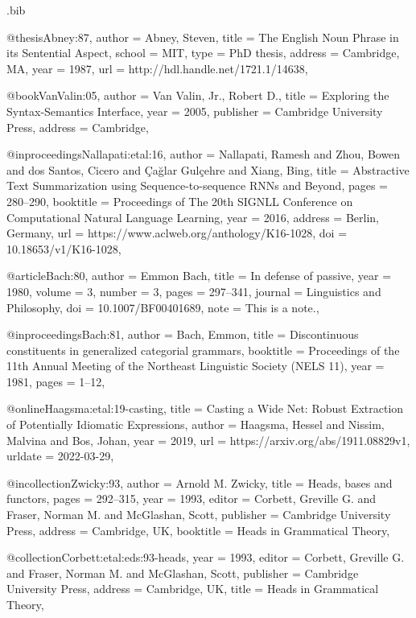 \begin{filecontents}[overwrite]{\jobname.bib}

@thesis{Abney:87,
  author = {Abney, Steven},
  title = {The {English} Noun Phrase in its Sentential Aspect},
  school = {MIT},
  type = {PhD thesis},
  address = {Cambridge, MA},
  year = {1987},
  url = {http://hdl.handle.net/1721.1/14638},
}

@book{VanValin:05,
  author = {Van Valin, Jr., Robert D.},
  title = {Exploring the Syntax-Semantics Interface},
  year = {2005},
  publisher = {Cambridge University Press},
  address = {Cambridge},
}

@inproceedings{Nallapati:etal:16,
  author = {Nallapati, Ramesh and Zhou, Bowen and dos Santos, Cicero and  Çağlar Gulçehre and Xiang, Bing},
  title = {Abstractive Text Summarization using Sequence-to-sequence {RNN}s and Beyond},
  pages = {280--290},
  booktitle = {Proceedings of The 20th {SIGNLL} Conference on Computational Natural Language Learning},
  year = {2016},
  address = {Berlin, Germany},
  url = {https://www.aclweb.org/anthology/K16-1028},
  doi = {10.18653/v1/K16-1028},
}

@article{Bach:80,
  author = {Emmon Bach},
  title = {In defense of passive},
  year = {1980},
  volume = {3},
  number = {3},
  pages = {297--341},
  journal = {Linguistics and Philosophy},
  doi = {10.1007/BF00401689},
  note = {This is a note.},
}

@inproceedings{Bach:81,
  author = {Bach, Emmon},
  title = {Discontinuous constituents in generalized categorial grammars},
  booktitle = {Proceedings of the 11th Annual Meeting of the Northeast Linguistic Society (NELS 11)},
  year = {1981},
  pages = {1--12},
}

@online{Haagsma:etal:19-casting,
  title = {Casting a Wide Net: {Robust} Extraction of Potentially Idiomatic Expressions},
  author = {Haagsma, Hessel and Nissim, Malvina and Bos, Johan},
  year = {2019},
  url = {https://arxiv.org/abs/1911.08829v1},
  urldate = {2022-03-29},
}

@incollection{Zwicky:93,
  author = {Arnold M. Zwicky},
  title = {Heads, bases and functors},
  pages = {292--315},
  year = {1993},
  editor = {Corbett, Greville G. and Fraser, Norman M. and McGlashan, Scott},
  publisher = {Cambridge University Press},
  address = {Cambridge, UK},
  booktitle = {Heads in Grammatical Theory},
}

@collection{Corbett:etal:eds:93-heads,
  year = {1993},
  editor = {Corbett, Greville G. and Fraser, Norman M. and McGlashan, Scott},
  publisher = {Cambridge University Press},
  address = {Cambridge, UK},
  title = {Heads in Grammatical Theory},
}


\end{filecontents}

